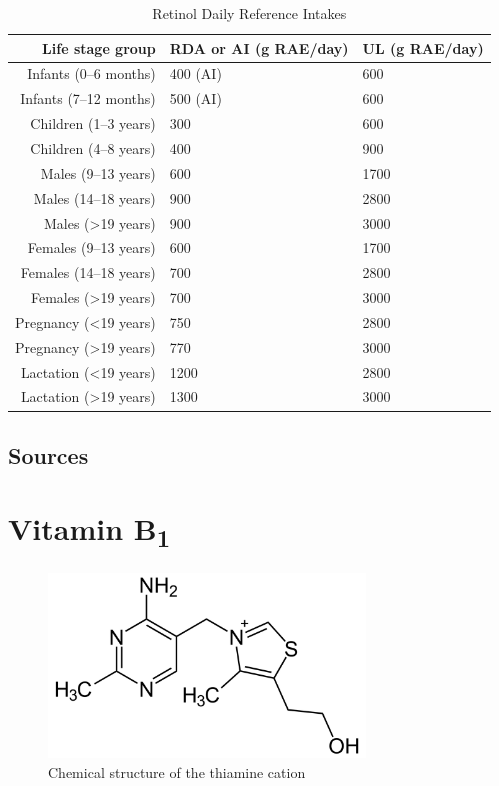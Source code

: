 \documentclass{book}
\begin{document}
\begin{table}[h]
	\caption{Retinol Daily Reference Intakes}
	\centering \begin{tabular}{| r | l | l |}
		\hline
		\textbf{Life stage group} & \textbf{RDA or AI (\textmu g RAE/day)} & \textbf{UL (\textmu g RAE/day)}\\ \hline
		Infants (0--6 months) & 400 (AI) & 600\\ \hline
		Infants (7--12 months) & 500 (AI) & 600\\ \hline
		Children (1--3 years) & 300 & 600\\ \hline
		Children (4--8 years) & 400 & 900\\ \hline
		Males (9--13 years) & 600 & 1700\\ \hline
		Males (14--18 years) & 900 & 2800\\ \hline
		Males (\textgreater19 years) & 900 & 3000\\ \hline
		Females (9--13 years) & 600 & 1700\\ \hline
		Females (14--18 years) & 700 & 2800\\ \hline
		Females (\textgreater19 years) & 700 & 3000\\ \hline
		Pregnancy (\textless19 years) & 750 & 2800\\ \hline
		Pregnancy (\textgreater19 years) & 770 & 3000\\ \hline
		Lactation (\textless19 years) & 1200 & 2800\\ \hline
		Lactation (\textgreater19 years) & 1300 & 3000\\ \hline
	\end{tabular}
\end{table}
\newpage

\section{Sources}


\chapter{Vitamin B\textsubscript{1}}
\begin{figure}[h]
	\caption{Chemical structure of  the thiamine cation}
	\centering \includegraphics[width=0.75\textwidth]{images/Vitamin_B1_chemical_structure}
\end{figure}
\end{document}
